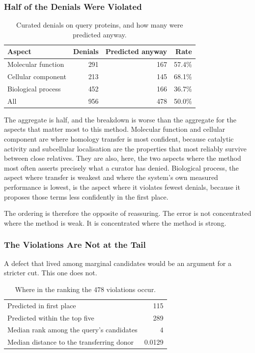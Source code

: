 \subsubsection{Half of the Denials Were Violated}

\begin{table}[htbp]
\centering
\caption{Curated denials on query proteins, and how many were predicted anyway.}
\label{tab:exp16-by-aspect}
\begin{tabular}{lrrr}
\toprule
Aspect & Denials & Predicted anyway & Rate \\
\midrule
Molecular function & 291 & 167 & 57.4\% \\
Cellular component & 213 & 145 & 68.1\% \\
Biological process & 452 & 166 & 36.7\% \\
\midrule
All & 956 & 478 & 50.0\% \\
\bottomrule
\end{tabular}
\end{table}

The aggregate is half, and the breakdown is worse than the aggregate for the aspects
that matter most to this method. Molecular function and cellular component are where
homology transfer is most confident, because catalytic activity and subcellular
localisation are the properties that most reliably survive between close relatives.
They are also, here, the two aspects where the method most often asserts precisely
what a curator has denied. Biological process, the aspect where transfer is weakest
and where the system's own measured performance is lowest, is the aspect where it
violates fewest denials, because it proposes those terms less confidently in the first
place.

The ordering is therefore the opposite of reassuring. The error is not concentrated
where the method is weak. It is concentrated where the method is strong.

\subsubsection{The Violations Are Not at the Tail}

A defect that lived among marginal candidates would be an argument for a stricter cut.
This one does not.

\begin{table}[htbp]
\centering
\caption{Where in the ranking the 478 violations occur.}
\label{tab:exp16-position}
\begin{tabular}{lr}
\toprule
Predicted in first place & 115 \\
Predicted within the top five & 289 \\
Median rank among the query's candidates & 4 \\
Median distance to the transferring donor & 0.0129 \\
\bottomrule
\end{tabular}
\end{table}

